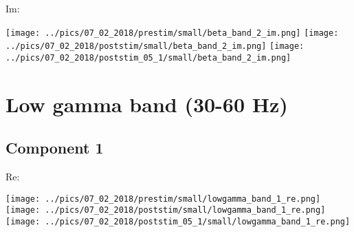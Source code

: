 \documentclass{article}
\begin{document}
Im:

\hspace{0.5cm}
\texttt{[image: ../pics/07\_02\_2018/prestim/small/beta\_band\_2\_im.png]}
\hspace{0.5cm}
\texttt{[image: ../pics/07\_02\_2018/poststim/small/beta\_band\_2\_im.png]}
\hspace{0.5cm}
\texttt{[image: ../pics/07\_02\_2018/poststim\_05\_1/small/beta\_band\_2\_im.png]}


\section{Low gamma band (30-60 Hz)}
\subsection*{Component 1}
Re:


\hspace{0.5cm}
\texttt{[image: ../pics/07\_02\_2018/prestim/small/lowgamma\_band\_1\_re.png]}
\hspace{0.5cm}
\texttt{[image: ../pics/07\_02\_2018/poststim/small/lowgamma\_band\_1\_re.png]}
\hspace{0.5cm}
\texttt{[image: ../pics/07\_02\_2018/poststim\_05\_1/small/lowgamma\_band\_1\_re.png]}
\end{document}
